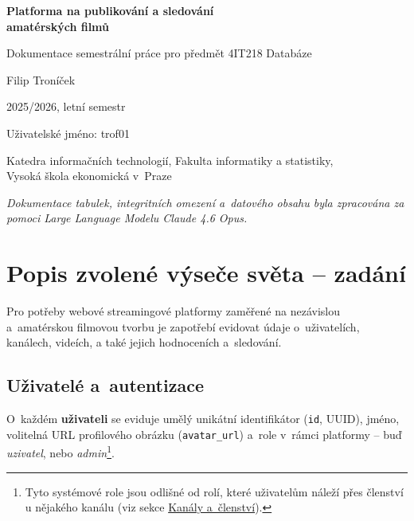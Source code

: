 \documentclass[12pt,a4paper]{article}
\begin{document}
\begin{titlepage}
\centering
\vspace*{2cm}
{\LARGE\bfseries Platforma na publikování a sledování\\amatérských filmů\par}
\vspace{1cm}
{\Large Dokumentace semestrální práce pro předmět 4IT218 Databáze\par}
\vspace{1.5cm}
{\Large Filip Troníček\par}
\vspace{0.5cm}
{\Large 2025/2026, letní semestr\par}
\vspace{1cm}
{\large Uživatelské jméno: trof01\par}
\vfill
{\large Katedra informačních technologií, Fakulta informatiky a statistiky,\\
Vysoká škola ekonomická v~Praze\par}
\end{titlepage}

\tableofcontents

\vfill
\noindent\textit{Dokumentace tabulek, integritních omezení a~datového obsahu byla zpracována
za pomoci Large Language Modelu Claude 4.6 Opus.}
\newpage

\section{Popis zvolené výseče světa -- zadání}

Pro potřeby webové streamingové platformy zaměřené na nezávislou a~amatérskou filmovou tvorbu
je zapotřebí evidovat údaje o~uživatelích, kanálech, videích, a také jejich hodnoceních a~sledování.

\subsection*{Uživatelé a~autentizace}

O~každém \textbf{uživateli} se eviduje umělý unikátní identifikátor (\texttt{id}, UUID), jméno,
volitelná URL profilového obrázku (\texttt{avatar\_url}) a~role v~rámci platformy --
buď \emph{uzivatel}, nebo \emph{admin}\footnote{Tyto systémové role jsou odlišné od rolí, které uživatelům náleží přes členství u nějakého kanálu (viz sekce \hyperref[sec:memberships]{Kanály a~členství}).}.
\end{document}
